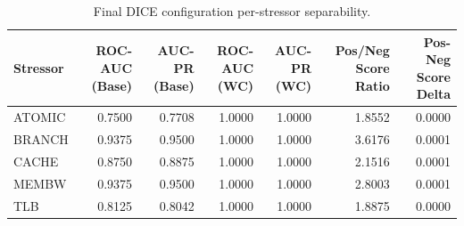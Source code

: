 \begin{table}[t]
\centering
\caption{Final DICE configuration per-stressor separability.}
\label{tab:dice_full_stressor}
\footnotesize
\begin{tabular}{lrrrrrr}
\toprule
Stressor & ROC-AUC (Base) & AUC-PR (Base) & ROC-AUC (WC) & AUC-PR (WC) & Pos/Neg Score Ratio & Pos-Neg Score Delta \\
\midrule
ATOMIC & 0.7500 & 0.7708 & 1.0000 & 1.0000 & 1.8552 & 0.0000 \\
BRANCH & 0.9375 & 0.9500 & 1.0000 & 1.0000 & 3.6176 & 0.0001 \\
CACHE & 0.8750 & 0.8875 & 1.0000 & 1.0000 & 2.1516 & 0.0001 \\
MEMBW & 0.9375 & 0.9500 & 1.0000 & 1.0000 & 2.8003 & 0.0001 \\
TLB & 0.8125 & 0.8042 & 1.0000 & 1.0000 & 1.8875 & 0.0000 \\
\bottomrule
\end{tabular}

\end{table}
